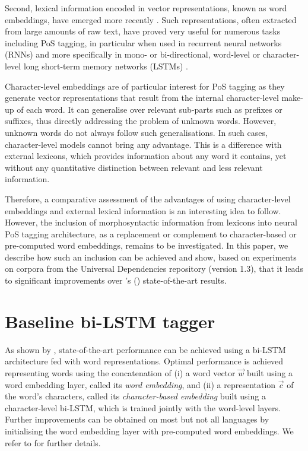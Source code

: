 \documentclass[11pt,letterpaper]{article}
\begin{document}
Second, lexical information encoded in vector representations, known as word embeddings, have emerged more
recently \cite{bengio03,collobert08,chrupala13,ling15,ballesteros15,muller15}. Such representations, often
extracted from large amounts of raw text, have proved very useful for numerous tasks including PoS tagging, in
particular when used in recurrent neural networks (RNNs) and more specifically in mono- or bi-directional, word-level or
character-level long short-term memory networks (LSTMs) \cite{hochreiter97,ling15,ballesteros15,plank16}.

Character-level embeddings are of particular interest for PoS tagging as they generate vector representations that
result from the internal character-level make-up of each word. It can generalise over relevant sub-parts such as
prefixes or suffixes, thus directly addressing the problem of unknown words. However, unknown words do not always follow
such generalisations. In such cases, character-level models cannot bring any advantage. This is a difference with
external lexicons, which provides information about any word it contains, yet without any quantitative distinction
between relevant and less relevant information.

Therefore, a comparative assessment of the advantages of using character-level embeddings and external lexical
information is an interesting idea to follow. However, the inclusion of morphosyntactic information from lexicons
into neural PoS tagging architecture, as a replacement or complement to character-based or pre-computed word embeddings,
remains to be investigated. In this paper, we describe how such an inclusion can be achieved and show, based on
experiments on corpora from the Universal Dependencies repository (version 1.3), that it leads to significant
improvements over \citeauthor{plank16}'s (\citeyear{plank16}) state-of-the-art results.


\section{Baseline bi-LSTM tagger}
\label{sec:baselinearchitecture}
As shown by \citet{plank16}, state-of-the-art performance can be achieved using a bi-LSTM architecture fed with word
representations. Optimal performance is achieved representing words using the concatenation of (i) a word vector
$\vec{w}$ built using a word embedding layer, called its {\em word embedding}, and (ii) a representation $\vec{c}$ of
the word's characters, called its {\em character-based embedding} built using a character-level bi-LSTM, which is
trained jointly with the word-level layers. Further improvements can be obtained on most but not all languages by
initialising the word embedding layer with pre-computed word embeddings. We refer to \citet{plank16} for further details.
\end{document}
